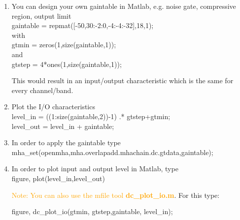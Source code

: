 \documentclass[11pt,a4paper,twoside]{article}
\newcommand{\+}{\discretionary{\mbox{\scriptsize$\hookleftarrow$}}{}{}}
\begin{document}
{{\begin{enumerate}
The variables {\ttfamily gtmin} (minimum input level) and {\ttfamily gtstep} (input level increment) expect vectors, but we have assigned scalar values to {\ttfamily gtmin} and {\ttfamily gtstep} previously. Scalar values will be interpreted as vectors of length 1 by the MHA when assigned to vector variables. The dc plugin allows vectors of length 1 for variables {\ttfamily gtmin} and {\ttfamily gtstep}, in this case the same value applies to every channel/band. It is also possible to have different {\ttfamily gtmin}/{\ttfamily gtstep} values for each channel/band by assigning a vector of values to these variables where the number of elements in the vector is equal to the number of channels/bands.

\item You can design your own gaintable in Matlab, e.g. noise gate, compressive region, output limit \\
  {\ttfamily gaintable = repmat([-50,30:-2:0,-4:-4:-32],18,1);} \\
  with \\
  {\ttfamily gtmin = zeros(1,size(gaintable,1));} \\
  and \\
  {\ttfamily gtstep = 4*ones(1,size(gaintable,1));} 
  

This would result in an input/output characteristic which is the same for every channel/band.

\item Plot the I/O characteristics \\
{\ttfamily level\_in = ((1:size(gaintable,2))-1) .* gtstep\textquotesingle{}+gtmin\textquotesingle{};}\\
{\ttfamily level\_out = level\_in + gaintable;}

\item In order to apply the gaintable type \\
{\ttfamily mha\_set(openmha,\textquotesingle{}mha.overlapadd.mhachain.dc.gtdata\textquotesingle{},gaintable);}
\item In order to plot input and output level in Matlab, type \\ {\ttfamily figure, plot(level\_in\textquotesingle{},level\_out\textquotesingle{})}

\textcolor{orange}{Note: You can also use the mfile tool \textbf{dc\_plot\_io.m}}. For this type: 

{\ttfamily figure, dc\_plot\_io(gtmin, gtstep,gaintable, level\_in);}



\end{enumerate}}}
\end{document}
